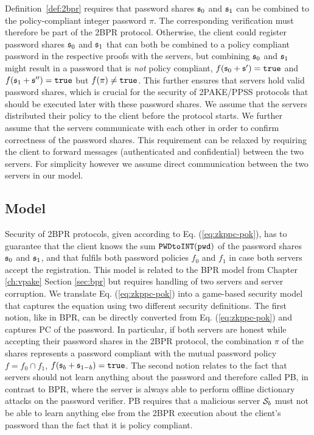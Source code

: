 \noindent
Definition~\ref{def:2bpr} requires that password shares $\mathfrak{s}_0$ and $\mathfrak{s}_1$ can be combined to the policy-compliant integer password $\pi$. The corresponding verification must therefore be part of the \ac{2BPR} protocol. 
Otherwise, the client could register password shares $\mathfrak{s}_0$ and $\mathfrak{s}_1$ that can both be combined to a policy compliant password in the respective proofs with the servers, but combining $\mathfrak{s}_0$ and $\mathfrak{s}_1$ might result in a password that is \emph{not} policy compliant, \ie $f(\mathfrak{s}_0+\mathfrak{s}')=\mathtt{true}$ and $f(\mathfrak{s}_1+\mathfrak{s}'')=\mathtt{true}$ but $f(\pi)\not=\mathtt{true}$.
This further ensures that servers hold valid password shares, which is crucial for the security of \ac{2PAKE}/\ac{PPSS} protocols that should be executed later with these password shares.
We assume that the servers distributed their policy to the client before the protocol starts.
We further assume that the servers communicate with each other in order to confirm correctness of the password shares.
This requirement can be relaxed by requiring the client to forward messages (authenticated and confidential) between the two servers.
For simplicity however we assume direct communication between the two servers in our model.


\subsection{Model}\label{sec:securitymodel}
Security of \ac{2BPR} protocols, given according to Eq. (\ref{eq:zkppc-pok}), has to guarantee that the client knows the sum $\texttt{PWDtoINT}(\mathtt{pwd})$ of the password shares $\mathfrak{s}_0$ and $\mathfrak{s}_1$, and that \pwd fulfils both password policies $f_0$ and $f_1$ in case both servers accept the registration.
This model is related to the \ac{BPR} model from Chapter \ref{ch:vpake} Section \ref{sec:bpr} but requires handling of two servers and server corruption.
We translate Eq. (\ref{eq:zkppc-pok}) into a game-based security model that captures the equation using two different security definitions.
The first notion, like in \ac{BPR}, can be directly converted from Eq. (\ref{eq:zkppc-pok}) and captures \acl{PC} of the password.
In particular, if both servers are honest while accepting their password shares in the \ac{2BPR} protocol, the combination $\pi$ of the shares represents a password compliant with the mutual password policy $f=f_0\cap f_1$, \ie $f(\mathfrak{s}_b+\mathfrak{s}_{1-b})=\mathtt{true}$.
The second notion relates to the fact that servers should not learn anything about the password and therefore called \ac{PB}, in contrast to \ac{BPR}, where the server is always able to perform offline dictionary attacks on the password verifier.
\ac{PB} requires that a malicious server $\mathcal{S}_b$ must not be able to learn anything else from the \ac{2BPR} execution about the client's password than the fact that it is policy compliant.

